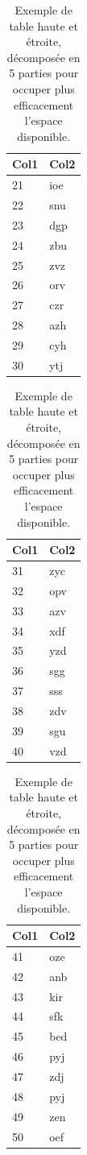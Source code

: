 \documentclass{ceri}
\begin{document}
\begin{table}[htb]
	\begin{minipage}[t]{0.19\linewidth}
		\centering
		\begin{tabular}{l l}
			\hline
			\rowcolor{DarkColor} 
			\textbf{Col1} 			& \textbf{Col2} \\ 
			\hline
			21 & ioe \\
			22 & snu \\
			23 & dgp \\
			24 & zbu \\
			25 & zvz \\
			26 & orv \\
			27 & czr \\
			28 & azh \\
			29 & cyh \\
			30 & ytj \\
			\hline
		\end{tabular}
	\end{minipage}
	\begin{minipage}[t]{0.19\linewidth}
		\centering
		\begin{tabular}{l l}
			\hline
			\rowcolor{DarkColor} 
			\textbf{Col1} 			& \textbf{Col2} \\ 
			\hline
			31 & zyc \\
			32 & opv \\
			33 & azv \\
			34 & xdf \\
			35 & yzd \\
			36 & sgg \\
			37 & sss \\
			38 & zdv \\
			39 & sgu \\
			40 & vzd \\
			\hline
		\end{tabular}
	\end{minipage}
	\begin{minipage}[t]{0.19\linewidth}
		\centering
		\begin{tabular}{l l}
			\hline
			\rowcolor{DarkColor} 
			\textbf{Col1} 			& \textbf{Col2} \\ 
			\hline
			41 & oze \\
			42 & anb \\
			43 & kir \\
			44 & sfk \\
			45 & bed \\
			46 & pyj \\
			47 & zdj \\
			48 & pyj \\
			49 & zen \\
			50 & oef \\
			\hline
		\end{tabular}
	\end{minipage}
	\caption{Exemple de table haute et étroite, décomposée en 5 parties pour occuper plus efficacement l'espace disponible.}
	\label{tab:etroit}
\end{table}
\end{document}
